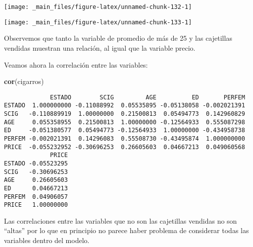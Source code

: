 \documentclass[
  a4paper,
  oneside,
  openany]{book}
\newenvironment{Shaded}{\begin{snugshade}}{\end{snugshade}}
\newcommand{\AttributeTok}[1]{\textcolor[rgb]{0.13,0.29,0.53}{#1}}
\newcommand{\DecValTok}[1]{\textcolor[rgb]{0.00,0.00,0.81}{#1}}
\newcommand{\FunctionTok}[1]{\textcolor[rgb]{0.13,0.29,0.53}{\textbf{#1}}}
\newcommand{\NormalTok}[1]{#1}
\newcommand{\SpecialCharTok}[1]{\textcolor[rgb]{0.81,0.36,0.00}{\textbf{#1}}}
\newcommand{\StringTok}[1]{\textcolor[rgb]{0.31,0.60,0.02}{#1}}
\begin{document}
\begin{center}\texttt{[image: \_main\_files/figure-latex/unnamed-chunk-132-1]} \end{center}

\begin{Shaded}
\end{Shaded}

\begin{center}\texttt{[image: \_main\_files/figure-latex/unnamed-chunk-133-1]} \end{center}

Observemos que tanto la variable de promedio de más de 25 y las cajetillas vendidas muestran una relación, al igual que la variable precio.

Veamos ahora la correlación entre las variables:

\begin{Shaded}
\begin{Highlighting}[]
\FunctionTok{cor}\NormalTok{(cigarros)}
\end{Highlighting}
\end{Shaded}

\begin{verbatim}
             ESTADO        SCIG         AGE          ED       PERFEM
ESTADO  1.000000000 -0.11088992  0.05535895 -0.05138058 -0.002021391
SCIG   -0.110889919  1.00000000  0.21500813  0.05494773  0.142960829
AGE     0.055358955  0.21500813  1.00000000 -0.12564933  0.555087298
ED     -0.051380577  0.05494773 -0.12564933  1.00000000 -0.434958738
PERFEM -0.002021391  0.14296083  0.55508730 -0.43495874  1.000000000
PRICE  -0.055232952 -0.30696253  0.26605603  0.04667213  0.049060568
             PRICE
ESTADO -0.05523295
SCIG   -0.30696253
AGE     0.26605603
ED      0.04667213
PERFEM  0.04906057
PRICE   1.00000000
\end{verbatim}

Las correlaciones entre las variables que no son las cajetillas vendidas no son ``altas'' por lo que en principio no parece haber problema de considerar todas las variables dentro del modelo.
\end{document}
